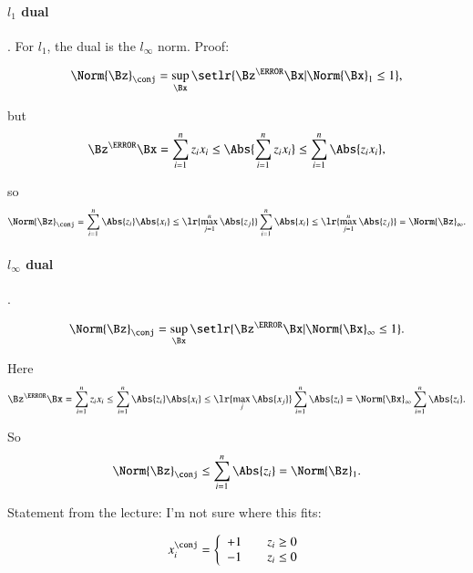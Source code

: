 \paragraph{\( l_1 \) dual}.
For \( l_1 \), the dual is the \( l_\infty \) norm.  Proof:

\begin{equation}\label{eqn:convex-optimizationLecture2:184}
\Norm{\Bz}_\conj
=
\sup_\Bx \setlr{ \Bz^\T \Bx | \Norm{\Bx}_1 \le 1 },
\end{equation}

but
\begin{dmath}\label{eqn:convex-optimizationLecture2:204}
\Bz^\T \Bx
=
\sum_{i=1}^n z_i x_i \le
\Abs{
\sum_{i=1}^n z_i x_i
}
\le
\sum_{i=1}^n \Abs{z_i x_i },
\end{dmath}

so
\begin{dmath}\label{eqn:convex-optimizationLecture2:224}
\Norm{\Bz}_\conj
=
\sum_{i=1}^n \Abs{z_i}\Abs{ x_i }
\le \lr{ \max_{j=1}^n \Abs{z_j} }
\sum_{i=1}^n \Abs{ x_i }
\le \lr{ \max_{j=1}^n \Abs{z_j} }
=
\Norm{\Bz}_\infty.
\end{dmath}


\paragraph{\( l_\infty \) dual}.


\begin{equation}\label{eqn:convex-optimizationLecture2:244}
\Norm{\Bz}_\conj
=
\sup_\Bx \setlr{ \Bz^\T \Bx | \Norm{\Bx}_\infty \le 1 }.
\end{equation}

Here
\begin{dmath}\label{eqn:convex-optimizationLecture2:264}
\Bz^\T \Bx
=
\sum_{i=1}^n z_i x_i
\le
\sum_{i=1}^n \Abs{z_i}\Abs{ x_i }
\le
\lr{ \max_j \Abs{ x_j } }
\sum_{i=1}^n \Abs{z_i}
=
\Norm{\Bx}_\infty
\sum_{i=1}^n \Abs{z_i}.
\end{dmath}

So
\begin{equation}\label{eqn:convex-optimizationLecture2:284}
\Norm{\Bz}_\conj
\le
\sum_{i=1}^n \Abs{z_i}
=
\Norm{\Bz}_1.
\end{equation}

Statement from the lecture: I'm not sure where this fits:

\begin{dmath}\label{eqn:convex-optimizationLecture2:304}
x_i^\conj
=
\left\{
\begin{array}{l l}
+1 & \quad \mbox{\( z_i \ge 0 \)} \\
-1 & \quad \mbox{\( z_i \le 0 \)}
\end{array}
\right.
\end{dmath}


